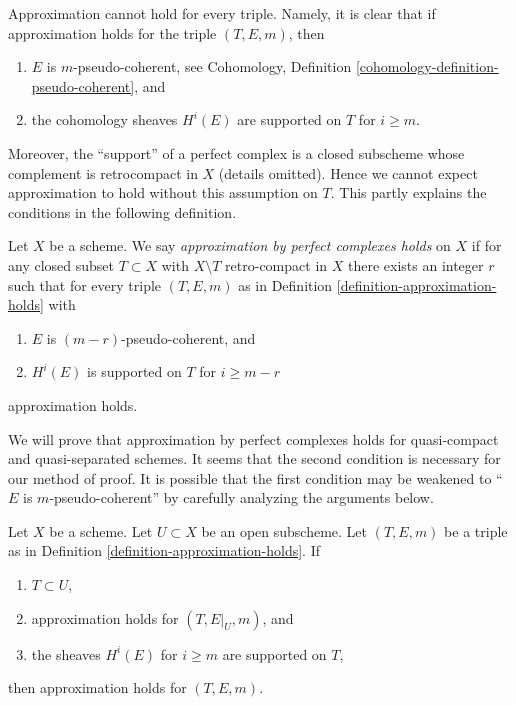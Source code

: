 \noindent
Approximation cannot hold for every triple. Namely, it is clear that if
approximation holds for the triple $(T, E, m)$, then
\begin{enumerate}
\item $E$ is $m$-pseudo-coherent, see
Cohomology, Definition \ref{cohomology-definition-pseudo-coherent}, and
\item the cohomology sheaves $H^i(E)$ are supported on $T$ for $i \geq m$.
\end{enumerate}
Moreover, the ``support'' of a perfect complex is a closed subscheme
whose complement is retrocompact in $X$ (details omitted). Hence we cannot
expect approximation to hold without this assumption on $T$.
This partly explains the conditions in the following definition.

\begin{definition}
\label{definition-approximation}
Let $X$ be a scheme. We say {\it approximation by perfect complexes holds}
on $X$ if for any closed subset $T \subset X$ with $X \setminus T$
retro-compact in $X$ there exists an integer $r$ such that
for every triple $(T, E, m)$ as in
Definition \ref{definition-approximation-holds} with
\begin{enumerate}
\item $E$ is $(m - r)$-pseudo-coherent, and
\item $H^i(E)$ is supported on $T$ for $i \geq m - r$
\end{enumerate}
approximation holds.
\end{definition}

\noindent
We will prove that approximation by perfect complexes holds for
quasi-compact and quasi-separated schemes. It seems that the second
condition is necessary for our method of proof. It is possible that the
first condition may be weakened to ``$E$ is $m$-pseudo-coherent''
by carefully analyzing the arguments below.

\begin{lemma}
\label{lemma-open}
Let $X$ be a scheme. Let $U \subset X$ be an open subscheme.
Let $(T, E, m)$ be a triple as in
Definition \ref{definition-approximation-holds}.
If
\begin{enumerate}
\item $T \subset U$,
\item approximation holds for $(T, E|_U, m)$, and
\item the sheaves $H^i(E)$ for $i \geq m$ are supported on $T$,
\end{enumerate}
then approximation holds for $(T, E, m)$.
\end{lemma}

